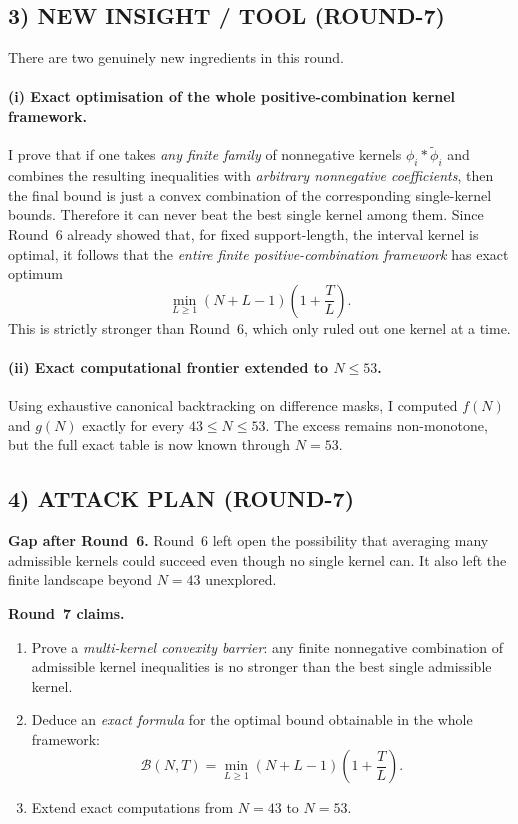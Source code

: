 \subsection{3) NEW INSIGHT / TOOL (ROUND-7)}

There are two genuinely new ingredients in this round.

\paragraph{(i) Exact optimisation of the whole positive-combination kernel framework.}
I prove that if one takes \emph{any finite family} of nonnegative kernels $\phi_i*\widetilde\phi_i$ and combines the resulting inequalities with \emph{arbitrary nonnegative coefficients}, then the final bound is just a convex combination of the corresponding single-kernel bounds.  Therefore it can never beat the best single kernel among them.  Since Round~6 already showed that, for fixed support-length, the interval kernel is optimal, it follows that the \emph{entire finite positive-combination framework} has exact optimum
\[
\min_{L\ge 1}(N+L-1)\left(1+\frac{T}{L}\right).
\]
This is strictly stronger than Round~6, which only ruled out one kernel at a time.

\paragraph{(ii) Exact computational frontier extended to $N\le 53$.}
Using exhaustive canonical backtracking on difference masks, I computed $f(N)$ and $g(N)$ exactly for every $43\le N\le 53$.  The excess remains non-monotone, but the full exact table is now known through $N=53$.

\subsection{4) ATTACK PLAN (ROUND-7)}

\textbf{Gap after Round~6.}
Round~6 left open the possibility that averaging many admissible kernels could succeed even though no single kernel can.  It also left the finite landscape beyond $N=43$ unexplored.

\textbf{Round~7 claims.}
\begin{enumerate}
\item Prove a \emph{multi-kernel convexity barrier}: any finite nonnegative combination of admissible kernel inequalities is no stronger than the best single admissible kernel.
\item Deduce an \emph{exact formula} for the optimal bound obtainable in the whole framework:
\[
\mathcal B(N,T)=\min_{L\ge 1}(N+L-1)\left(1+\frac{T}{L}\right).
\]
\item Extend exact computations from $N=43$ to $N=53$.
\end{enumerate}

